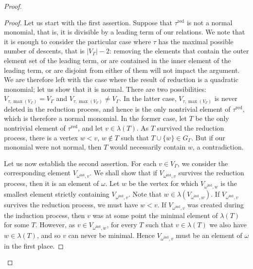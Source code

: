 \documentclass[11pt]{article}
\theoremstyle{definition}
\numberwithin{equation}{section}
\begin{document}
\begin{proof}
\begin{proof}
Let us start with the first assertion. Suppose that $\tau^{\mathrm{red}}$ is not a normal monomial, that is, it is divisible by a leading term of our relations. We note that it is enough to consider the particular case where $\tau$ has the maximal possible number of descents, that is $|V_\Gamma|-2$: removing the elements that contain the outer element set of the leading term, or are contained in the inner element of the leading term, or are disjoint from either of them will not impact the argument. We are therefore left with the case where the result of reduction is a quadratic monomial; let us show that it is normal. There are two possibilities: $V_{\tau,\max(V_\Gamma)}=V_\Gamma$ and $V_{\tau,\max(V_\Gamma)}\ne V_\Gamma$. In the latter case, $V_{\tau,\max(V_\Gamma)}$ is never deleted in the reduction process, and hence is the only nontrivial element of $\tau^{\mathrm{red}}$, which is therefore a normal monomial. In the former case, let $T$ be the only nontrivial element of $\tau^{\mathrm{red}}$, and let $v\in\lambda(T)$. As $T$ survived the reduction process, there is a vertex $w<v$, $w\not\in T$ such that $T\cup\{w\}\in G_\Gamma$. But if our monomial were not normal, then $T$ would necessarily contain $w$, a contradiction. 

Let us now establish the second assertion. For each $v\in V_\Gamma$, we consider the corresponding element $V_{\omega^{\mathrm{ind}},v}$. We shall show that if $V_{\omega^{\mathrm{ind}},v}$ survives the reduction process, then it is an element of $\omega$. Let $w$ be the vertex for which $V_{\omega^{\mathrm{ind}},w}$ is the smallest element strictly containing $V_{\omega^{\mathrm{ind}},v}$. Note that $w\in\lambda(V_{\omega^{\mathrm{ind}},w})$. If $V_{\omega^{\mathrm{ind}},v}$ survives the reduction process, we must have $w<v$. If $V_{\omega^{\mathrm{ind}},v}$ was created during the induction process, then $v$ was at some point the minimal element of $\lambda(T)$ for some $T$. However, as $v\in V_{\omega^{\mathrm{ind}},w}$, for every $T$ such that $v\in \lambda(T)$ we also have $w\in\lambda(T)$, and so $v$ can never be minimal. Hence $V_{\omega^{\mathrm{ind}},v}$ must be an element of $\omega$ in the first place.


\end{proof}
\end{proof}
\end{document}
